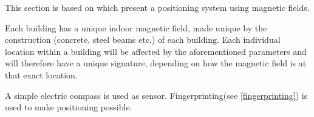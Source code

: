 This section is based on \citet{geomagnetism} which present a positioning system using magnetic fields.

Each building has a unique indoor magnetic field, made unique by the construction (concrete, steel beams etc.) of each building.
Each individual location within a building will be affected by the aforementioned parameters and will therefore have a unique signature, depending on how the magnetic field is at that exact location.

A simple electric compass is used as sensor.
Fingerprinting(see \cref{fingerprinting}) is used to make positioning possible.

